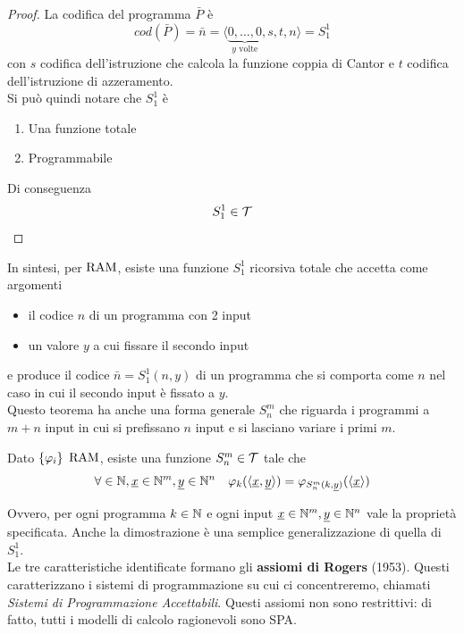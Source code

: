 \begin{proof}
	La codifica del programma $\bar{P}$ è 
	$$ cod(\bar{P}) = \bar{n} = \langle \underbrace{0,\dots,0}_{y\text{ volte}},s,t,n \rangle = S^1_1 $$
	con $s$ codifica dell'istruzione che calcola la funzione coppia di Cantor e $t$ codifica dell'istruzione di azzeramento.\\
	
	Si può quindi notare che $S_1^1$ è 
	\begin{enumerate}
		\item Una funzione totale
		\item Programmabile
	\end{enumerate}
	Di conseguenza
	$$ S_1^1 \in \mathcal{T} $$
\end{proof}

In sintesi, per $\text{RAM}$, esiste una funzione $S_1^1$ ricorsiva totale che accetta come argomenti
\begin{itemize}
	\item il codice $n$ di un programma con 2 input
	\item un valore $y$ a cui fissare il secondo input
\end{itemize}
e produce il codice $\bar{n} = S^1_1 (n,y)$ di un programma che si comporta come $n$ nel caso in cui il secondo input è fissato a $y$.\\

Questo teorema ha anche una forma generale $S_n^m$ che riguarda i programmi a $m+n$ input in cui si prefissano $n$ input e si lasciano variare i primi $m$.\\

\begin{theor}[$S_n^m$]
	Dato $\{\varphi_i\}$ $\text{RAM}$, esiste una funzione $S_n^m \in \mathcal{T}$ tale che
	$$ \forall  \in \mathbb{N}, \underline{x} \in \mathbb{N}^m, \underline{y} \in \mathbb{N}^n \quad \varphi_k (\langle \underline{x}, \underline{y} \rangle) = \varphi_{S_n^m (k, \underline{y})} (\langle \underline{x} \rangle) $$
\end{theor}

Ovvero, per ogni programma $k \in \mathbb{N}$ e ogni input $\underline{x} \in \mathbb{N}^m, \underline{y} \in \mathbb{N}^n$ vale la proprietà specificata. Anche la dimostrazione è una semplice generalizzazione di quella di $S_1^1$.\\

Le tre caratteristiche identificate formano gli \textbf{assiomi di Rogers} (1953). Questi caratterizzano i sistemi di programmazione su cui ci concentreremo, chiamati \textit{Sistemi di Programmazione Accettabili}. Questi assiomi non sono restrittivi: di fatto, tutti i modelli di calcolo ragionevoli sono SPA.\\

